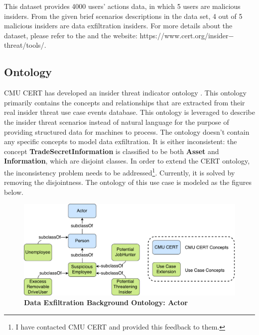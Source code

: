 This dataset provides 4000 users' actions data, in which 5 users are malicious insiders. 
From the given brief scenarios descriptions in the data set, 4 out of 5 malicious insiders are data exfiltration insiders. 
For more details about the dataset, please refer to the \cite{glasser2013bridging} and the website: https://www.cert.org/insider$-$threat/tools/.
%
\subsection{Ontology}
CMU CERT has developed an insider threat indicator ontology \cite{costa2014ontology}.
This ontology primarily contains the concepts and relationships that are extracted from their real insider threat use case events database. 
This ontology is leveraged to describe the insider threat scenarios instead of natural language for the purpose of providing structured data for machines to process. 
The ontology doesn't contain any specific concepts to model data exfiltration. 
It is either inconsistent: 
the concept \textbf{TradeSecretInformation} is classified to be both \textbf{Asset} and \textbf{Information}, which are disjoint classes.
In order to extend the CERT ontology, the inconsistency problem needs to be addressed\footnote{I have contacted CMU CERT and provided this feedback to them.}. 
Currently, it is solved by removing the disjointness.
The ontology of this use case is modeled as the figures below. 

\begin{figure}[!htbp]
	\centering
    \includegraphics[width=5in]{img/5-dxoactor.pdf}
    \caption{\textbf{Data Exfiltration Background Ontology: Actor}}
    \label{fig:actor}
\end{figure}

